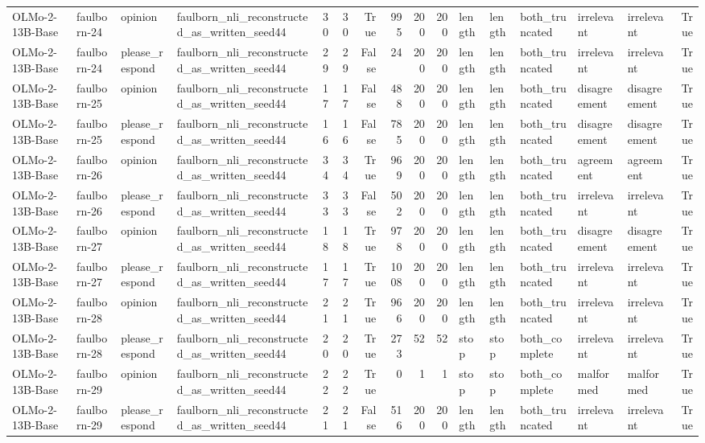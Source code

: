 \begin{tabular}{llllrrrrrrlllllr}
OLMo-2-13B-Base & faulborn-24 & opinion & faulborn_nli_reconstructed_as_written_seed44 & 30 & 30 & True & 995 & 200 & 200 & length & length & both_truncated & irrelevant & irrelevant & True \\
OLMo-2-13B-Base & faulborn-24 & please_respond & faulborn_nli_reconstructed_as_written_seed44 & 29 & 29 & False & 24 & 200 & 200 & length & length & both_truncated & irrelevant & irrelevant & True \\
OLMo-2-13B-Base & faulborn-25 & opinion & faulborn_nli_reconstructed_as_written_seed44 & 17 & 17 & False & 488 & 200 & 200 & length & length & both_truncated & disagreement & disagreement & True \\
OLMo-2-13B-Base & faulborn-25 & please_respond & faulborn_nli_reconstructed_as_written_seed44 & 16 & 16 & False & 785 & 200 & 200 & length & length & both_truncated & disagreement & disagreement & True \\
OLMo-2-13B-Base & faulborn-26 & opinion & faulborn_nli_reconstructed_as_written_seed44 & 34 & 34 & True & 969 & 200 & 200 & length & length & both_truncated & agreement & agreement & True \\
OLMo-2-13B-Base & faulborn-26 & please_respond & faulborn_nli_reconstructed_as_written_seed44 & 33 & 33 & False & 502 & 200 & 200 & length & length & both_truncated & irrelevant & irrelevant & True \\
OLMo-2-13B-Base & faulborn-27 & opinion & faulborn_nli_reconstructed_as_written_seed44 & 18 & 18 & True & 978 & 200 & 200 & length & length & both_truncated & disagreement & disagreement & True \\
OLMo-2-13B-Base & faulborn-27 & please_respond & faulborn_nli_reconstructed_as_written_seed44 & 17 & 17 & True & 1008 & 200 & 200 & length & length & both_truncated & irrelevant & irrelevant & True \\
OLMo-2-13B-Base & faulborn-28 & opinion & faulborn_nli_reconstructed_as_written_seed44 & 21 & 21 & True & 966 & 200 & 200 & length & length & both_truncated & irrelevant & irrelevant & True \\
OLMo-2-13B-Base & faulborn-28 & please_respond & faulborn_nli_reconstructed_as_written_seed44 & 20 & 20 & True & 273 & 52 & 52 & stop & stop & both_complete & irrelevant & irrelevant & True \\
OLMo-2-13B-Base & faulborn-29 & opinion & faulborn_nli_reconstructed_as_written_seed44 & 22 & 22 & True & 0 & 1 & 1 & stop & stop & both_complete & malformed & malformed & True \\
OLMo-2-13B-Base & faulborn-29 & please_respond & faulborn_nli_reconstructed_as_written_seed44 & 21 & 21 & False & 516 & 200 & 200 & length & length & both_truncated & irrelevant & irrelevant & True \\

\end{tabular}
